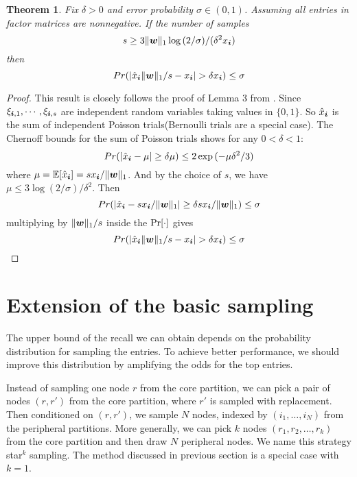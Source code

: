 \documentclass[letterpaper]{article}
\newcommand{\score}[1]{\xi_{\V{i},#1}}
\newcommand{\V}[1]{{\boldsymbol{{\MakeLowercase{#1}}}}}
\newcommand{\predx}{\hat{x}_{\V{i}}}
\newcommand{\norm}[2]{\|#1\|_{#2}}
\newtheorem{theorem}{Theorem}
\begin{document}
\begin{theorem}\label{theo:Bound}
Fix $\delta > 0$ and error probability $\sigma \in (0,1)$.
Assuming all entries in factor matrices are nonnegative.
If the number of samples
\[
    s \geq 3\norm{\V{w}}{1}\log{(2/\sigma)}/(\delta^2 x_{\V{i}})
\]
then
\[
    Pr(|\predx\norm{\V{W}}{1}/s - x_{\V{i}}| > \delta x_{\V{i}}) \leq \sigma
\]
\end{theorem}

\begin{proof}
This result is closely follows the proof of Lemma 3 from \cite{BaPiKoSe15}.
Since  $ \score{1},\cdots,\score{s} $
are independent random variables taking values in $\{0,1\}$.
So $\predx$ is the sum of independent Poisson trials(Bernoulli trials are a special case).
The Chernoff bounds for the sum of Poisson trials shows for any $0 <\delta <1 $:
\[
    Pr(|\predx - \mu|\geq\delta\mu) \leq 2\exp{(-\mu\delta^2/3)}
\]
where $\mu=\mathbb{E}[\predx]=sx_{\V{i}}/\norm{\V{W}}{1}$.
And by the choice of $s$, we have
$\mu\leq 3\log{(2/\sigma)/\delta^2}$.
Then
\[
    Pr(|\predx-sx_{\V{i}}/\norm{\V{W}}{1}|\geq\delta sx_{\V{i}}/\norm{\V{W}}{1}) \leq \sigma
\]
multiplying by $\norm{\V{W}}{1}/s$ inside the ${\rm Pr}[\cdot]$ gives
\[
    Pr(|\predx\norm{\V{W}}{1}/s - x_{\V{i}}| > \delta x_{\V{i}}) \leq \sigma
\]
\end{proof}


\section{Extension of the basic sampling}
The upper bound of the recall we can obtain 
depends on the probability distribution for sampling the entries. 
To achieve better performance, 
we should improve this distribution by amplifying the odds for the top entries.

Instead of sampling one node $r$ from the core partition, 
we can pick a pair of nodes $(r,r')$ from the core partition, 
where $r'$ is sampled with replacement. 
Then conditioned on $(r,r')$, we sample $N$ nodes, 
indexed by $(i_1,\ldots,i_N)$ from the peripheral partitions. 
More generally, we can pick $k$ nodes $(r_1,r_2,\ldots,r_k)$ from the core partition 
and then draw $N$ peripheral nodes. 
We name this strategy star$^k$ sampling. 
The method discussed in previous section is a special case with $k=1$.
\end{document}
